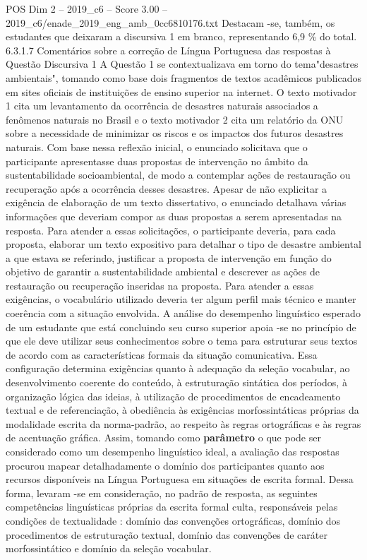 \begin{textsample}{POS Dim 2 – 2019\_c6 – Score 3.00 – 2019\_c6/enade\_2019\_eng\_amb\_0cc6810176.txt}
Destacam -se, também, os estudantes que deixaram a discursiva 1 em branco, representando 6,9 \% do total. 6.3.1.7 Comentários sobre a correção de Língua Portuguesa das respostas à Questão Discursiva 1 A Questão 1 se contextualizava em torno do tema"desastres ambientais", tomando como base dois fragmentos de textos acadêmicos publicados em sites oficiais de instituições de ensino superior na internet.
O texto motivador 1 cita um levantamento da ocorrência de desastres naturais associados a fenômenos naturais no Brasil e o texto motivador 2 cita um relatório da ONU sobre a necessidade de minimizar os riscos e os impactos dos futuros desastres naturais.
Com base nessa reflexão inicial, o enunciado solicitava que o participante apresentasse duas propostas de intervenção no âmbito da sustentabilidade socioambiental, de modo a contemplar ações de restauração ou recuperação após a ocorrência desses desastres.
Apesar de não explicitar a exigência de elaboração de um texto dissertativo, o enunciado detalhava várias informações que deveriam compor as duas propostas a serem apresentadas na resposta.
Para atender a essas solicitações, o participante deveria, para cada proposta, elaborar um texto expositivo para detalhar o tipo de desastre ambiental a que estava se referindo, justificar a proposta de intervenção em função do objetivo de garantir a sustentabilidade ambiental e descrever as ações de restauração ou recuperação inseridas na proposta.
Para atender a essas exigências, o vocabulário utilizado deveria ter algum perfil mais técnico e manter coerência com a situação envolvida.
A análise do desempenho linguístico esperado de um estudante que está concluindo seu curso superior apoia -se no princípio de que ele deve utilizar seus conhecimentos sobre o tema para estruturar seus textos de acordo com as características formais da situação comunicativa.
Essa configuração determina exigências quanto à adequação da seleção vocabular, ao desenvolvimento coerente do conteúdo, à estruturação sintática dos períodos, à organização lógica das ideias, à utilização de procedimentos de encadeamento textual e de referenciação, à obediência às exigências morfossintáticas próprias da modalidade escrita da norma-padrão, ao respeito às regras ortográficas e às regras de acentuação gráfica.
Assim, tomando como \textbf{parâmetro} o que pode ser considerado como um desempenho linguístico ideal, a avaliação das respostas procurou mapear detalhadamente o domínio dos participantes quanto aos recursos disponíveis na Língua Portuguesa em situações de escrita formal.
Dessa forma, levaram -se em consideração, no padrão de resposta, as seguintes competências linguísticas próprias da escrita formal culta, responsáveis pelas condições de textualidade : domínio das convenções ortográficas, domínio dos procedimentos de estruturação textual, domínio das convenções de caráter morfossintático e domínio da seleção vocabular.

\end{textsample}
